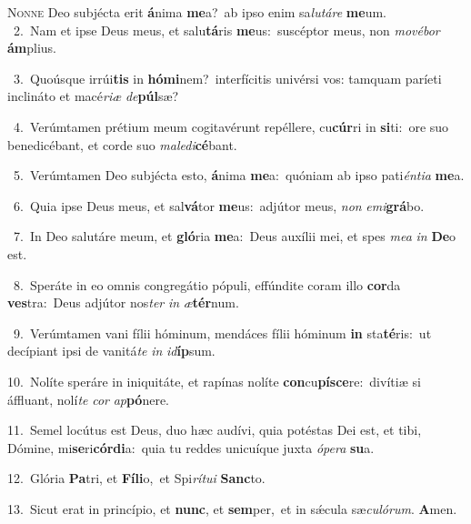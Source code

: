 \lettrine{\initial\textcolor{\initialcolor}{N}}{onne} Deo subjécta erit \textbf{á}\-nima \textbf{me}\-a?~\star ab ipso enim sa\-\textit{lu}\-\textit{tá}\textit{re} \textbf{me}\-um.\\
{\numbfont\textcolor{\numbcolor}{~2.}}~Nam et ipse Deus meus, et salu\-\textbf{tá}\-ris \textbf{me}\-us:~\star suscéptor meus, non \textit{mo}\-\textit{vé}\textit{bor} \textbf{ám}\-plius.\par
{\numbfont\textcolor{\numbcolor}{~3.}}~Quoúsque irrúi\textbf{tis} in \textbf{hó}\-\textbf{mi}nem?~\star interfícitis univérsi vos: tamquam paríeti inclináto et macé\-\textit{ri}\-\textit{æ} \textit{de}\-\textbf{púl}sæ?\par
{\numbfont\textcolor{\numbcolor}{~4.}}~Verúmtamen prétium meum cogitavérunt repéllere, cu\-\textbf{cúr}\-ri in \textbf{si}\-ti:~\star ore suo benedicébant, et corde suo \textit{ma}\-\textit{le}\textit{di}\textbf{cé}bant.\par
{\numbfont\textcolor{\numbcolor}{~5.}}~Verúmtamen Deo subjécta esto, \textbf{á}\-nima \textbf{me}\-a:~\star quóniam ab ipso pati\-\textit{én}\-\textit{ti}\textit{a} \textbf{me}\-a.\par
{\numbfont\textcolor{\numbcolor}{~6.}}~Quia ipse Deus meus, et sal\-\textbf{vá}\-tor \textbf{me}\-us:~\star adjútor meus, \textit{non} \textit{e}\-\textit{mi}\textbf{grá}bo.\par
{\numbfont\textcolor{\numbcolor}{~7.}}~In Deo salutáre meum, et \textbf{gló}\-ria \textbf{me}\-a:~\star Deus auxílii mei, et spes \textit{me}\-\textit{a} \textit{in} \textbf{De}\-o est.\par
{\numbfont\textcolor{\numbcolor}{~8.}}~Speráte in eo omnis congregátio pópuli, effúndite coram illo \textbf{cor}\-da \textbf{ves}\-tra:~\star Deus adjútor nos\textit{ter} \textit{in} \textit{æ}\-\textbf{tér}num.\par
{\numbfont\textcolor{\numbcolor}{~9.}}~Verúmtamen vani fílii hóminum, mendáces fílii hóminum \textbf{in} sta\-\textbf{té}\-ris:~\star ut decípiant ipsi de vanitá\textit{te} \textit{in} \textit{id}\-\textbf{íp}sum.\par
{\numbfont\textcolor{\numbcolor}{10.}}~Nolíte speráre in iniquitáte, et rapínas nolíte \textbf{con}\-cu\-\textbf{pí}\-\textbf{sce}re:~\star divítiæ si áffluant, nolí\textit{te} \textit{cor} \textit{ap}\-\textbf{pó}nere.\par
{\numbfont\textcolor{\numbcolor}{11.}}~Semel locútus est Deus, duo hæc audívi, quia potéstas Dei est, et tibi, Dómine, mi\-\textbf{se}\-ri\-\textbf{cór}\-\textbf{di}a:~\star quia tu reddes unicuíque juxta \textit{ó}\-\textit{pe}\textit{ra} \textbf{su}\-a.\par
{\numbfont\textcolor{\numbcolor}{12.}}~Glória \textbf{Pa}\-tri, et \textbf{Fí}\-\textbf{li}o,~\star et Spi\-\textit{rí}\-\textit{tu}\textit{i} \textbf{Sanc}\-to.\par
{\numbfont\textcolor{\numbcolor}{13.}}~Sicut erat in princípio, et \textbf{nunc}\-, et \textbf{sem}\-per,~\star et in sǽcula sæ\-\textit{cu}\-\textit{ló}\textit{rum}. \textbf{A}\-men.\par
